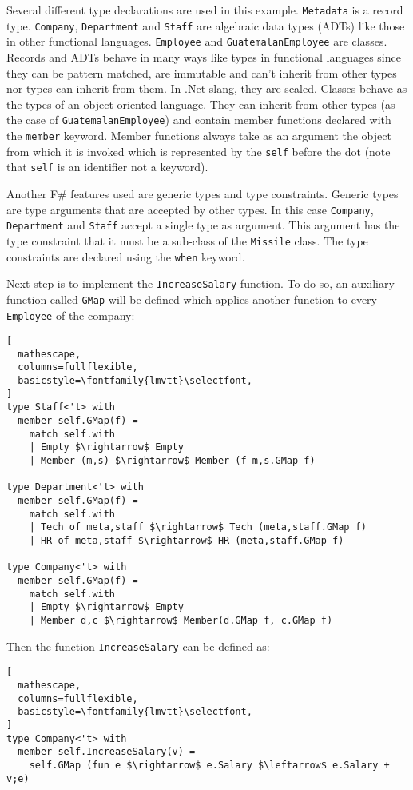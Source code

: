 \documentclass{sigplanconf}
\begin{document}
Several different type declarations are used in this
example. \verb+Metadata+ is a record type. \verb+Company+,
\verb+Department+ and \verb+Staff+ are algebraic data types (ADTs)
like those in other functional languages. \verb+Employee+ and
\verb+GuatemalanEmployee+ are classes. Records and ADTs behave in many
ways like types in functional languages since they can be pattern
matched, are immutable and can't inherit from other types nor types
can inherit from them. In .Net slang, they are sealed. Classes behave
as the types of an object oriented language. They can inherit from
other types (as the case of \verb+GuatemalanEmployee+) and contain
member functions declared with the \verb+member+ keyword. Member
functions always take as an argument the object from which it is
invoked which is represented by the \verb+self+ before the dot (note
that \verb+self+ is an identifier not a keyword).

Another F\# features used are generic types and type
constraints. Generic types are type arguments that are accepted by
other types. In this case \verb+Company+, \verb+Department+ and
\verb+Staff+ accept a single type as argument. This argument has the
type constraint that it must be a sub-class of the \verb+Missile+
class. The type constraints are declared using the \verb+when+
keyword.

Next step is to implement the \verb+IncreaseSalary+ function. To do
so, an auxiliary function called \verb+GMap+ will be defined which
applies another function to every \verb+Employee+ of the company:
\begin{lstlisting}[
  mathescape,
  columns=fullflexible,
  basicstyle=\fontfamily{lmvtt}\selectfont,
]
type Staff<'t> with
  member self.GMap(f) = 
    match self.with
    | Empty $\rightarrow$ Empty
    | Member (m,s) $\rightarrow$ Member (f m,s.GMap f)

type Department<'t> with
  member self.GMap(f) =
    match self.with
    | Tech of meta,staff $\rightarrow$ Tech (meta,staff.GMap f)
    | HR of meta,staff $\rightarrow$ HR (meta,staff.GMap f)

type Company<'t> with
  member self.GMap(f) =
    match self.with
    | Empty $\rightarrow$ Empty
    | Member d,c $\rightarrow$ Member(d.GMap f, c.GMap f)
\end{lstlisting}
Then the function \verb+IncreaseSalary+ can be defined as:
\begin{lstlisting}[
  mathescape,
  columns=fullflexible,
  basicstyle=\fontfamily{lmvtt}\selectfont,
]
type Company<'t> with
  member self.IncreaseSalary(v) =
    self.GMap (fun e $\rightarrow$ e.Salary $\leftarrow$ e.Salary + v;e)
\end{lstlisting}
\end{document}
